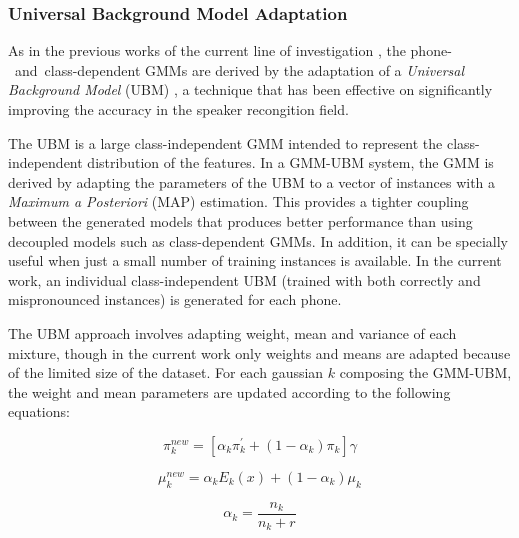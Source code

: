 
\subsubsection{Universal Background Model Adaptation} \label{subsubsection:ubm}

As in the previous works of the current line of investigation
\cite{detection_phone_level_mispronunciation_learning, main},
the \mbox{phone- and class-dependent} GMMs are derived by the adaptation of a
\textit{Universal Background Model} (UBM)
\cite{ubm_adaptation}, a technique that has been effective on significantly improving
the accuracy in the speaker recongition field.

The UBM is a large class-independent GMM intended to represent the class-independent distribution
of the features. In a GMM-UBM system, the GMM is derived by adapting the parameters of the UBM
to a vector of instances with a \textit{Maximum a Posteriori} (MAP) estimation. This provides a
tighter coupling between the generated models that produces better performance than using
decoupled models such as class-dependent GMMs. In addition, it can be specially useful when
just a small number of training instances is available.
In the current work, an individual
class-independent UBM (trained with both correctly and mispronounced instances)
is generated for each phone.

The UBM approach involves adapting weight, mean and variance of each
mixture, though in the current work only weights and means are adapted because of the limited
size of the dataset. For each gaussian $k$ composing the GMM-UBM, the weight and mean parameters
are updated according to the following equations:

\begin{equation}
  \pi_{k}^{new} = [\alpha_{k} \pi_{k}^{'} + (1-\alpha_{k}) \pi_{k}]\gamma
\end{equation}

\begin{equation}
  \mu_{k}^{new} = \alpha_{k} E_{k}(x) + (1-\alpha_{k})\mu_{k}
\end{equation}

\begin{equation}
  \alpha_{k} = \frac{n_{k}}{n_{k}+r}
\end{equation}

